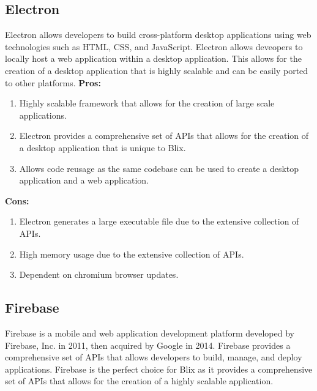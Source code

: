 \documentclass[11pt,a4paper]{article}
\begin{document}
\subsection*{Electron}

Electron allows developers to build cross-platform desktop applications using web technologies such as HTML, CSS, and JavaScript.
Electron allows deveopers to locally host a web application within a desktop application. 
This allows for the creation of a desktop application that is highly scalable and can be easily ported to other platforms.
\textbf{Pros:}

\begin{enumerate}[label*=\arabic*.]
	\item[\textbullet] Highly scalable framework that allows for the creation of large scale applications.
	\item[\textbullet] Electron provides a comprehensive set of APIs that allows for the creation of a desktop application that is unique to Blix.
	\item[\textbullet] Allows code reusage as the same codebase can be used to create a desktop application and a web application.
\end{enumerate}

\textbf{Cons:}

\begin{enumerate}[label*=\arabic*.]
	\item[\textbullet] Electron generates a large executable file due to the extensive collection of APIs.
	\item[\textbullet] High memory usage due to the extensive collection of APIs.
	\item[\textbullet] Dependent on chromium browser updates.
\end{enumerate}


\subsection*{Firebase}

Firebase is a mobile and web application development platform developed by Firebase, Inc. in 2011, then acquired by Google in 2014.
Firebase provides a comprehensive set of APIs that allows developers to build, manage, and deploy applications.
Firebase is the perfect choice for Blix as it provides a comprehensive set of APIs that allows for the creation of a highly scalable application.
\end{document}
